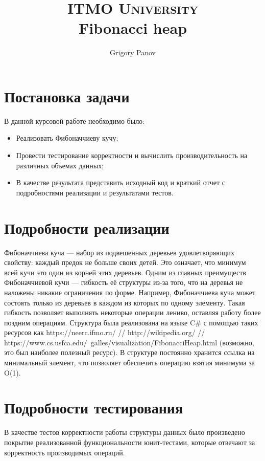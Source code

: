 \documentclass[article, a4paper]{llncs}
\title{
		\usefont{OT1}{bch}{b}{n}
		\normalfont \normalsize \textsc{ITMO University} \\ [25pt]
		\huge Fibonacci heap \\
}
\author{
		\normalfont 								
		\normalsize
        Grigory Panov\\[-5pt]		
        \normalsize
}
\institute{
\today
}
\date{}
\newcommand{\Csh}{C{\lserif\#}}
\begin{document}
\maketitle
    \section{Постановка задачи}
    В данной курсовой работе необходимо было:
    \begin{itemize}
        \item Реализовать Фибоначчиеву кучу;
        \item Провести тестирование корректности и вычислить производительность на различных объемах данных;
        \item В качестве результата представить исходный код и краткий отчет с подробностями реализации и
        результатами тестов.
    \end{itemize}
    
    \section{Подробности реализации}
    Фибоначчиева куча — набор из подвешенных деревьев удовлетворяющих свойству: каждый предок не больше своих детей. Это означает, что минимум всей кучи это один из корней этих деревьев. Одним из главных преимуществ Фибоначчиевой кучи — гибкость её структуры из-за того, что на деревья не наложены никакие ограничения по форме. Например, Фибоначчиева куча может состоять только из деревьев в каждом из которых по одному элементу. Такая гибкость позволяет выполнять некоторые операции лениво, оставляя работу более поздним операциям. Структура была реализована на языке \Csh{} с помощью таких ресурсов как https://neerc.ifmo.ru/  // http://wikipedia.org/ // https://www.cs.usfca.edu/~galles/visualization/FibonacciHeap.html (возможно, это был наиболее полезный ресурс). В структуре постоянно хранится ссылка на минимальный элемент, что позволяет обеспечить операцию взятия минимума за O(1). 
    \section{Подробности тестирования}
    В качестве тестов корректности работы структуры данных было произведено покрытие реализованной функциональности юнит-тестами, которые отвечают за корректность производимых операций.
    
\end{document}
